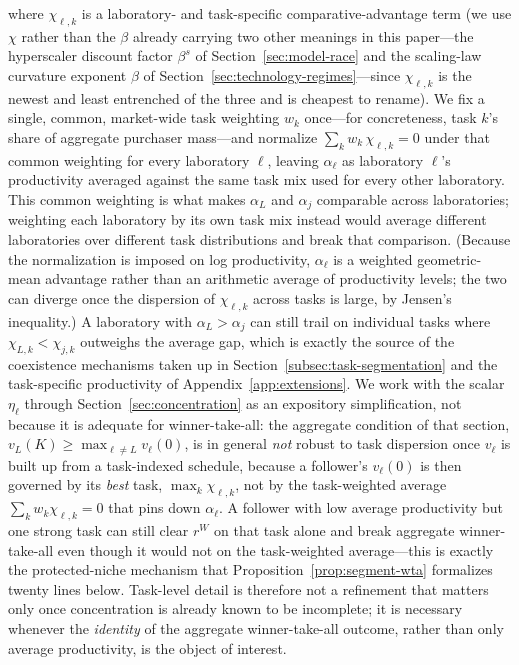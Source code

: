 \documentclass[11pt]{article}
\begin{document}
where $\chi_{\ell,k}$ is a laboratory- and task-specific comparative-advantage term (we use $\chi$ rather than the $\beta$ already carrying two other meanings in this paper---the hyperscaler discount factor $\beta^s$ of Section~\ref{sec:model-race} and the scaling-law curvature exponent $\beta$ of Section~\ref{sec:technology-regimes}---since $\chi_{\ell,k}$ is the newest and least entrenched of the three and is cheapest to rename). We fix a single, common, market-wide task weighting $w_k$ once---for concreteness, task $k$'s share of aggregate purchaser mass---and normalize $\sum_k w_k\,\chi_{\ell,k}=0$ under that common weighting for every laboratory $\ell$, leaving $\alpha_\ell$ as laboratory $\ell$'s productivity averaged against the same task mix used for every other laboratory. This common weighting is what makes $\alpha_L$ and $\alpha_j$ comparable across laboratories; weighting each laboratory by its own task mix instead would average different laboratories over different task distributions and break that comparison. (Because the normalization is imposed on log productivity, $\alpha_\ell$ is a weighted geometric-mean advantage rather than an arithmetic average of productivity levels; the two can diverge once the dispersion of $\chi_{\ell,k}$ across tasks is large, by Jensen's inequality.) A laboratory with $\alpha_L>\alpha_j$ can still trail on individual tasks where $\chi_{L,k}<\chi_{j,k}$ outweighs the average gap, which is exactly the source of the coexistence mechanisms taken up in Section~\ref{subsec:task-segmentation} and the task-specific productivity of Appendix~\ref{app:extensions}. We work with the scalar $\eta_\ell$ through Section~\ref{sec:concentration} as an expository simplification, not because it is adequate for winner-take-all: the aggregate condition of that section, $v_L(K)\geq\max_{\ell\neq L}v_\ell(0)$, is in general \emph{not} robust to task dispersion once $v_\ell$ is built up from a task-indexed schedule, because a follower's $v_\ell(0)$ is then governed by its \emph{best} task, $\max_k\chi_{\ell,k}$, not by the task-weighted average $\sum_k w_k\chi_{\ell,k}=0$ that pins down $\alpha_\ell$. A follower with low average productivity but one strong task can still clear $r^W$ on that task alone and break aggregate winner-take-all even though it would not on the task-weighted average---this is exactly the protected-niche mechanism that Proposition~\ref{prop:segment-wta} formalizes twenty lines below. Task-level detail is therefore not a refinement that matters only once concentration is already known to be incomplete; it is necessary whenever the \emph{identity} of the aggregate winner-take-all outcome, rather than only average productivity, is the object of interest.
\end{document}
